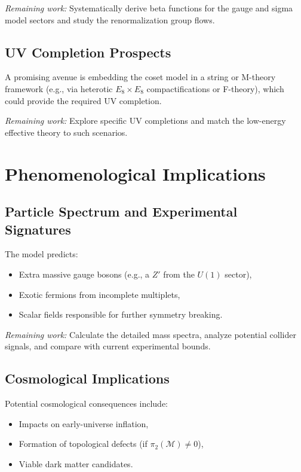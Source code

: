 \documentclass[aps,prd,preprint,groupedaddress]{revtex4-2}
\begin{document}
\emph{Remaining work:} Systematically derive beta functions for the gauge and sigma model sectors and study the renormalization group flows.

\subsection{UV Completion Prospects}
A promising avenue is embedding the coset model in a string or M-theory framework (e.g., via heterotic $E_8 \times E_8$ compactifications or F-theory), which could provide the required UV completion.

\emph{Remaining work:} Explore specific UV completions and match the low-energy effective theory to such scenarios.

\section{Phenomenological Implications}

\subsection{Particle Spectrum and Experimental Signatures}
The model predicts:
\begin{itemize}
  \item Extra massive gauge bosons (e.g., a $Z'$ from the $U(1)$ sector),
  \item Exotic fermions from incomplete multiplets,
  \item Scalar fields responsible for further symmetry breaking.
\end{itemize}

\emph{Remaining work:} Calculate the detailed mass spectra, analyze potential collider signals, and compare with current experimental bounds.

\subsection{Cosmological Implications}
Potential cosmological consequences include:
\begin{itemize}
  \item Impacts on early-universe inflation,
  \item Formation of topological defects (if $\pi_2(\mathcal{M})\neq 0$),
  \item Viable dark matter candidates.
\end{itemize}
\end{document}
